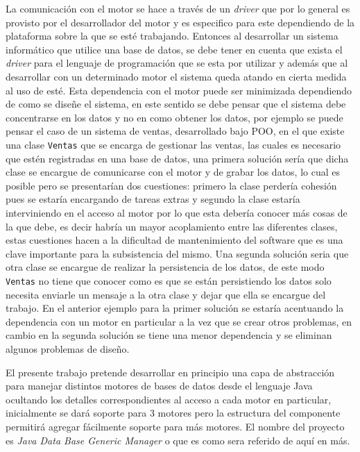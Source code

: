 La comunicación con el motor se hace a través de un \textit{driver} que por lo general es provisto por el desarrollador del motor y es especifico para este dependiendo de la plataforma sobre la que se esté trabajando. Entonces al desarrollar un sistema informático que utilice una base de datos,  se debe tener en cuenta que exista el \textit{driver} para el lenguaje de programación que se esta por utilizar y además que al desarrollar con un determinado motor el sistema queda atando en cierta medida al uso de esté. Esta dependencia con el motor puede ser minimizada dependiendo de como se diseñe el sistema, en este sentido se debe pensar que el sistema debe concentrarse en los datos y no en como obtener los datos, por ejemplo se puede pensar el caso de un sistema de ventas, desarrollado bajo POO, en el que existe una clase \verb=Ventas= que se encarga de gestionar las ventas, las cuales es necesario que estén registradas en una base de datos, una primera solución sería que dicha clase se encargue de comunicarse con el motor y de grabar los datos, lo cual es posible pero se presentarían dos cuestiones: primero la clase perdería cohesión pues se estaría encargando de tareas extras y segundo la clase estaría interviniendo en el acceso al motor por lo que esta debería conocer más cosas de la que debe, es decir habría un mayor acoplamiento entre las diferentes clases, estas cuestiones hacen a la dificultad de mantenimiento del software que es una clave importante para la subsistencia del mismo. Una segunda solución seria que otra clase se encargue de realizar la persistencia de los datos, de este modo \verb=Ventas= no tiene que conocer como es que se están persistiendo los datos solo necesita enviarle un mensaje a la otra clase y dejar que ella se encargue del trabajo. En el anterior ejemplo para la primer solución se estaría acentuando la dependencia con un motor en particular a la vez que se crear otros problemas, en cambio en la segunda solución se tiene una menor dependencia y se eliminan algunos problemas de diseño.

El presente trabajo pretende desarrollar en principio una capa de abstracción para manejar distintos motores de bases de datos desde el lenguaje Java ocultando los detalles correspondientes al acceso a cada motor en particular, inicialmente se dará soporte para 3 motores pero  la estructura del componente permitirá agregar fácilmente soporte para más motores. El nombre del proyecto es \textit{Java Data Base Generic Manager} o \jj que es como sera referido de aquí en más.
%
%
